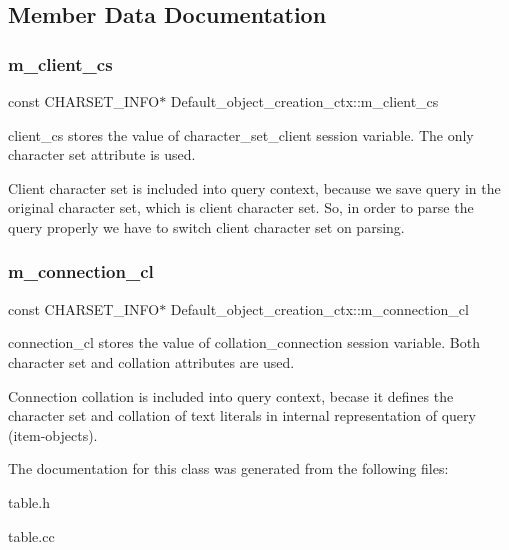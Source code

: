 \subsection{Member Data Documentation}
\mbox{\label{classDefault__object__creation__ctx_af69e5434f52f8465d05a7831429137b5}} 
\subsubsection{\texorpdfstring{m\+\_\+client\+\_\+cs}{m\_client\_cs}}
{\footnotesize\ttfamily const C\+H\+A\+R\+S\+E\+T\+\_\+\+I\+N\+FO$\ast$ Default\+\_\+object\+\_\+creation\+\_\+ctx\+::m\+\_\+client\+\_\+cs\hspace{0.3cm}{\ttfamily [protected]}}

client\+\_\+cs stores the value of character\+\_\+set\+\_\+client session variable. The only character set attribute is used.

Client character set is included into query context, because we save query in the original character set, which is client character set. So, in order to parse the query properly we have to switch client character set on parsing. \mbox{\label{classDefault__object__creation__ctx_ac3d2574166b4be26f3a6f967e4a6ac18}} 
\subsubsection{\texorpdfstring{m\+\_\+connection\+\_\+cl}{m\_connection\_cl}}
{\footnotesize\ttfamily const C\+H\+A\+R\+S\+E\+T\+\_\+\+I\+N\+FO$\ast$ Default\+\_\+object\+\_\+creation\+\_\+ctx\+::m\+\_\+connection\+\_\+cl\hspace{0.3cm}{\ttfamily [protected]}}

connection\+\_\+cl stores the value of collation\+\_\+connection session variable. Both character set and collation attributes are used.

Connection collation is included into query context, becase it defines the character set and collation of text literals in internal representation of query (item-\/objects). 

The documentation for this class was generated from the following files\+:\begin{DoxyCompactItemize}
\item 
table.\+h\item 
table.\+cc\end{DoxyCompactItemize}
